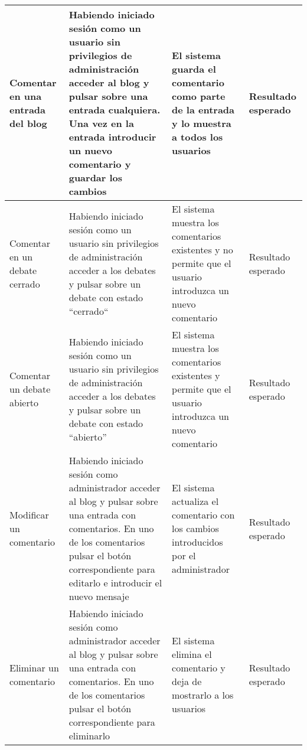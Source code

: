 \begin{landscape}
\begin{longtable}[c]{|p{50mm}|p{50mm}|p{50mm}|p{50mm}|}
	 	Comentar en una entrada del blog & Habiendo iniciado sesión como un usuario sin privilegios de administración acceder al blog y pulsar sobre una entrada cualquiera.  Una vez en la entrada introducir un nuevo comentario y guardar los cambios & El sistema guarda el comentario como parte de la entrada y lo muestra a todos los usuarios & Resultado esperado\\
	 	\hline
	 	Comentar en un debate cerrado & Habiendo iniciado sesión como un usuario sin privilegios de administración acceder a los debates y pulsar sobre un debate con estado ``cerrado`` & El sistema muestra los comentarios existentes y no permite que el usuario introduzca un nuevo comentario & Resultado esperado\\
	 	\hline
	 	Comentar un debate abierto & Habiendo iniciado sesión como un usuario sin privilegios de administración acceder a los debates y pulsar sobre un debate con estado ``abierto'' & El sistema muestra los comentarios existentes y permite que el usuario introduzca un nuevo comentario & Resultado esperado\\
	 	\hline
	 	Modificar un comentario & Habiendo iniciado sesión como administrador acceder al blog y pulsar sobre una entrada con comentarios.  En uno de los comentarios pulsar el botón correspondiente para editarlo e introducir el nuevo mensaje & El sistema actualiza el comentario con los cambios introducidos por el administrador & Resultado esperado\\
	 	\hline
	 	Eliminar un comentario & Habiendo iniciado sesión como administrador acceder al blog y pulsar sobre una entrada con comentarios.  En uno de los comentarios pulsar el botón correspondiente para eliminarlo & El sistema elimina el comentario y deja de mostrarlo a los usuarios & Resultado esperado\\
	 	\hline
	 	\hline
	 	
	 	 \end{longtable}
\end{landscape}



